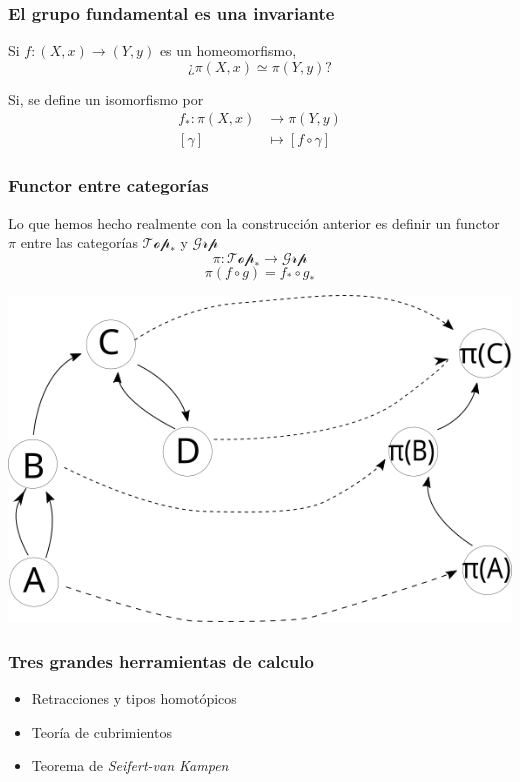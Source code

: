 \documentclass[xetex,mathserif,serif]{beamer}
\newcommand{\vank}{\emph{Seifert-van Kampen} }
\begin{document}
  \begin{frame}
    \frametitle{El grupo fundamental es una invariante}
    Si \(f : (X, x) \to (Y, y) \) es un homeomorfismo, \[¿\pi (X, x)
    \simeq \pi (Y,y)?\]

    \pause

    Si, se define un isomorfismo por
    \begin{align*}
      f_* : \pi (X,x) &\to \pi (Y, y) \\
      [\gamma] &\longmapsto [ f \circ \gamma ]
    \end{align*}
  \end{frame}

  \begin{frame}
    \frametitle{Functor entre categorías}
    Lo que hemos hecho realmente con la construcción anterior es definir
    un functor \(\pi\) entre las categorías \(\mathscr{Top}_*\) y
    \(\mathscr{Grp}\)
    \[ \pi : \mathscr{Top}_* \to \mathscr{Grp} \]
    \[ \pi (f \circ g) = f_* \circ g_* \]
    \begin{center}
      \includegraphics[scale=0.4]{./imag/categoria.png}
    \end{center}
  \end{frame}
  \begin{frame}
    \frametitle{Tres grandes herramientas de calculo}
    \begin{itemize}
    \item Retracciones y tipos homotópicos
    \item Teoría de cubrimientos
    \item Teorema de \vank
    \end{itemize}
  \end{frame}
\end{document}
